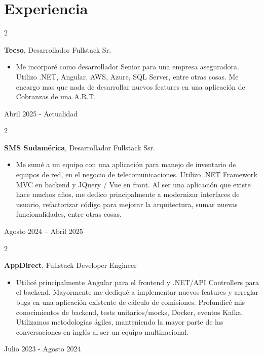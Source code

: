 \documentclass[10pt, letterpaper]{article}
\newenvironment{highlights}{
    \begin{itemize}[
        topsep=0.10 cm,
        parsep=0.10 cm,
        partopsep=0pt,
        itemsep=0pt,
        leftmargin=0.4 cm + 10pt
    ]
}{
    \end{itemize}
} %
\newenvironment{twocolentry}[2][]{
    \onecolentry
    \def\secondColumn{#2}
    \setcolumnwidth{\fill, 4.5 cm}
    \begin{paracol}{2}
}{
    \switchcolumn \raggedleft \secondColumn
    \end{paracol}
    \endonecolentry
} %
\begin{document}
    \section{Experiencia}

        \begin{twocolentry}{
            Abril 2025 - Actualidad
        }
            \textbf{Tecso}, Desarrollador Fullstack Sr.
            \begin{highlights}
                \item Me incorporé como desarrollador Senior para una empresa aseguradora. Utilizo .NET, Angular, AWS, Azure, SQL Server, entre otras cosas. Me encargo mas que nada de desarrollar nuevos features en una aplicación de Cobranzas de una A.R.T.
            \end{highlights}
        \end{twocolentry}


        \vspace{0.2 cm}

        
        \begin{twocolentry}{
        Agosto 2024 – Abril 2025
        }
            \textbf{SMS Sudamérica}, Desarrollador Fullstack Ssr.
            \begin{highlights}
                \item Me sumé a un equipo con una aplicación para manejo de inventario de equipos de red, en el negocio de telecomunicaciones. Utilizo .NET Framework MVC en backend y JQuery / Vue en front. Al ser una aplicación que existe hace muchos años, me dedico principalmente a modernizar interfaces de usuario, refactorizar código para mejorar la arquitectura, sumar nuevas funcionalidades, entre otras cosas.
            \end{highlights}
        \end{twocolentry}


        \vspace{0.2 cm}

        \begin{twocolentry}{

        Julio 2023 - Agosto 2024
        }
            \textbf{AppDirect}, Fullstack Developer Engineer
            \begin{highlights}
                \item Utilicé principalmente Angular para el frontend y .NET/API Controllers para el backend. Mayormente me dediqué a implementar nuevos features y arreglar bugs en una aplicación existente de cálculo de comisiones. Profundicé mis conocimientos de backend, tests unitarios/mocks, Docker, eventos Kafka. Utilizamos metodologías ágiles, manteniendo la mayor parte de las conversaciones en inglés al ser un equipo multinacional.
            \end{highlights}
        \end{twocolentry}
\end{document}
